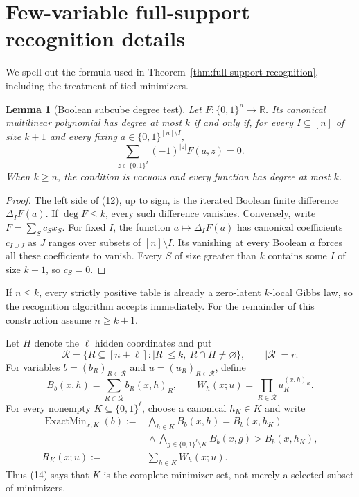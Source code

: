 \documentclass{article}
\newcommand{\bits}{\{0,1\}}
\newtheorem{lemma}{Lemma}
\begin{document}
\section{Few-variable full-support recognition details}
\label{app:full-support-recognition}

We spell out the formula used in
Theorem~\ref{thm:full-support-recognition}, including the treatment of tied
minimizers.

\begin{lemma}[Boolean subcube degree test]
\label{lem:subcube-degree}
Let $F:\bits^n\to\mathbb R$.  Its canonical multilinear polynomial has degree
at most $k$ if and only if, for every $I\subseteq[n]$ of size $k+1$ and every
fixing $a\in\bits^{[n]\setminus I}$,
\[
  \sum_{z\in\bits^I}(-1)^{|z|}F(a,z)=0.
  \tag{12}
\]
When $k\ge n$, the condition is vacuous and every function has degree at most
$k$.
\end{lemma}

\begin{proof}
The left side of (12), up to sign, is the iterated Boolean finite difference
$\Delta_I F(a)$.  If $\deg F\le k$, every such difference vanishes.  Conversely,
write $F=\sum_Sc_Sx_S$.  For fixed $I$, the function
$a\mapsto\Delta_IF(a)$ has canonical coefficients $c_{I\cup J}$ as $J$ ranges
over subsets of $[n]\setminus I$.  Its vanishing at every Boolean $a$ forces
all these coefficients to vanish.  Every $S$ of size greater than $k$ contains
some $I$ of size $k+1$, so $c_S=0$.
\end{proof}

If $n\le k$, every strictly positive table is already a zero-latent
$k$-local Gibbs law, so the recognition algorithm accepts immediately.
For the remainder of this construction assume $n\ge k+1$.

Let $H$ denote the $\ell$ hidden coordinates and put
\[
  \mathcal R=
  \{R\subseteq[n+\ell]:|R|\le k,\ R\cap H\ne\varnothing\},
  \qquad |\mathcal R|=r.
\]
For variables $b=(b_R)_{R\in\mathcal R}$ and
$u=(u_R)_{R\in\mathcal R}$, define
\[
  B_b(x,h)=\sum_{R\in\mathcal R}b_R(x,h)_R,
  \qquad
  W_h(x;u)=\prod_{R\in\mathcal R}u_R^{(x,h)_R}.
  \tag{13}
\]
For every nonempty $K\subseteq\bits^\ell$, choose a canonical $h_K\in K$ and
write
\[
\begin{split}
  \operatorname{ExactMin}_{x,K}(b):={}&
  \bigwedge_{h\in K} B_b(x,h)=B_b(x,h_K)\\
  &{}\wedge
  \bigwedge_{g\in\bits^\ell\setminus K}
  B_b(x,g)>B_b(x,h_K),\\
  R_K(x;u):={}&\sum_{h\in K}W_h(x;u).
\end{split}
\tag{14}
\]
Thus (14) says that $K$ is the complete minimizer set, not merely a selected
subset of minimizers.
\end{document}

